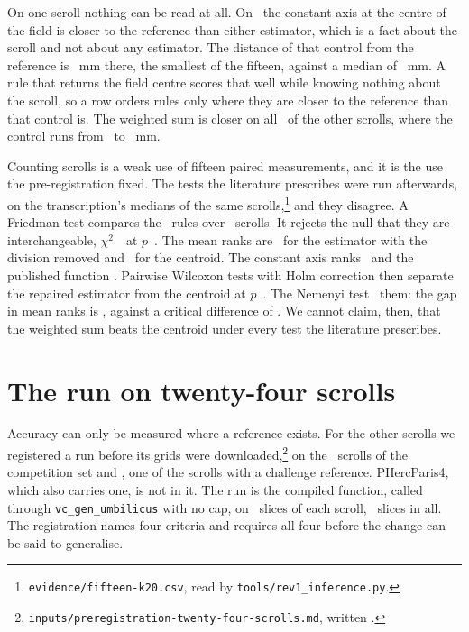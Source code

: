 On one scroll nothing can be read at all. On \RevInfNonDiscriminating\ the constant axis at the
centre of the field is closer to the reference than either estimator, which is a fact about the
scroll and not about any estimator. The distance of that control from the reference is
\RevFakeAxisMin~mm there, the smallest of the fifteen, against a median of \RevFakeAxisMedian~mm. A
rule that returns the field centre scores that well while knowing nothing about the scroll, so a
row orders rules only where they are closer to the reference than that control is. The weighted
sum is closer on all \RevFakeAxisOthers\ of the other scrolls, where the control runs from
\RevFakeAxisSecond\ to \RevFakeAxisMax~mm.

Counting scrolls is a weak use of fifteen paired measurements, and it is the use the
pre-registration fixed. The tests the literature prescribes were run afterwards, on the
transcription's medians of the same scrolls,\footnote{\texttt{evidence/fifteen-k20.csv}, read by
\texttt{tools/rev1\_inference.py}.} and they disagree. A Friedman test compares the \RevInfMethods\ rules over
\RevInfScrolls\ scrolls. It rejects the null that they are interchangeable, $\chi^2$~\RevInfChi\ at
$p$~\RevInfP. The mean ranks are \RevInfRankFixed\ for the estimator with the division removed and
\RevInfRankCentroid\ for the centroid. The constant axis ranks \RevInfRankFakeAxis\ and the
published function \RevInfRankAsIs. Pairwise Wilcoxon tests with Holm correction then separate the
repaired estimator from the centroid at $p$~\RevInfHolmVsCentroid. The Nemenyi test
\RevInfNemenyiVerdict\ them: the gap in mean ranks is \RevInfNemenyiGap, against a critical
difference of \RevInfNemenyiCD. We cannot claim, then, that the weighted sum beats the centroid
under every test the literature prescribes.

\section{The run on twenty-four scrolls}
\label{sec:twentyfour}

Accuracy can only be measured where a reference exists. For the other scrolls we registered a run
before its grids were downloaded,\footnote{\texttt{inputs/preregistration-twenty-four-scrolls.md},
written \RevPreTwentyFourWritten.} on the \RevRunInCompetition\ scrolls of the competition set and
\RevRunNotInCompetition, one of the scrolls with a challenge reference. PHercParis4, which also
carries one, is not in it. The run is the compiled function, called through
\texttt{vc\_gen\_umbilicus} with no cap, on \RevFifteenSlices\ slices of each scroll, \RevRunSlices\
slices in all. The registration names four criteria and requires all four before the change can
be said to generalise.

